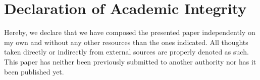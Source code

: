\section{Declaration of Academic Integrity}
Hereby, we declare that we have composed the presented paper independently on my own and without any other resources than the ones indicated. All thoughts taken directly or indirectly from external sources are properly denoted as such. This paper has neither been previously submitted to another authority nor has it been published yet.
\vspace{0.3in}
